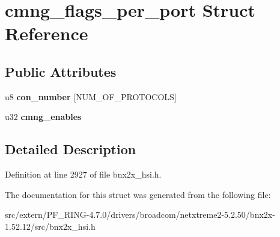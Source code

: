 \hypertarget{structcmng__flags__per__port}{
\section{cmng\_\-flags\_\-per\_\-port Struct Reference}
\label{structcmng__flags__per__port}
}
\subsection*{Public Attributes}
\begin{DoxyCompactItemize}
\item 
\hypertarget{structcmng__flags__per__port_a8a89e6c5bf9014bf73be0a50d46d764f}{
u8 {\bfseries con\_\-number} \mbox{[}NUM\_\-OF\_\-PROTOCOLS\mbox{]}}
\label{structcmng__flags__per__port_a8a89e6c5bf9014bf73be0a50d46d764f}

\item 
\hypertarget{structcmng__flags__per__port_aa6b11c63632ee3f92b5c0a8fee9a685a}{
u32 {\bfseries cmng\_\-enables}}
\label{structcmng__flags__per__port_aa6b11c63632ee3f92b5c0a8fee9a685a}

\end{DoxyCompactItemize}


\subsection{Detailed Description}


Definition at line 2927 of file bnx2x\_\-hsi.h.



The documentation for this struct was generated from the following file:\begin{DoxyCompactItemize}
\item 
src/extern/PF\_\-RING-\/4.7.0/drivers/broadcom/netxtreme2-\/5.2.50/bnx2x-\/1.52.12/src/bnx2x\_\-hsi.h\end{DoxyCompactItemize}
